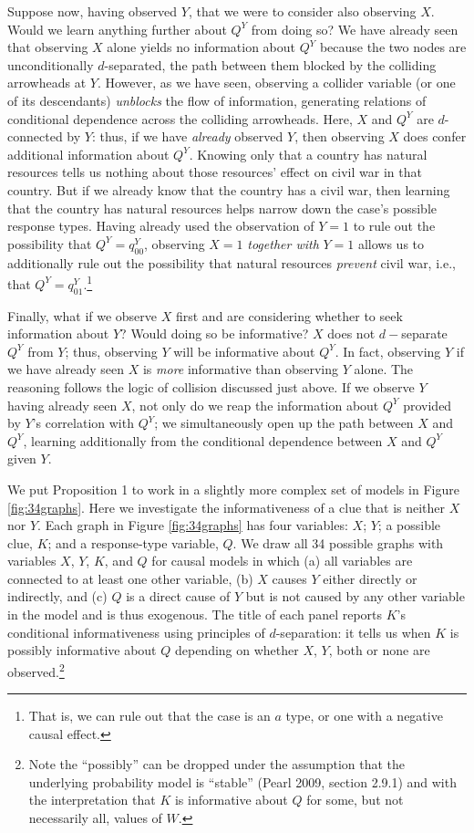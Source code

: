 \documentclass[
  12pt,
]{book}
\begin{document}
Suppose now, having observed \(Y\), that we were to consider also observing \(X\). Would we learn anything further about \(Q^Y\) from doing so? We have already seen that observing \(X\) alone yields no information about \(Q^Y\) because the two nodes are unconditionally \(d\)-separated, the path between them blocked by the colliding arrowheads at \(Y\). However, as we have seen, observing a collider variable (or one of its descendants) \emph{unblocks} the flow of information, generating relations of conditional dependence across the colliding arrowheads. Here, \(X\) and \(Q^Y\) are \(d\)-connected by \(Y\): thus, if we have \emph{already} observed \(Y\), then observing \(X\) does confer additional information about \(Q^Y\). Knowing only that a country has natural resources tells us nothing about those resources' effect on civil war in that country. But if we already know that the country has a civil war, then learning that the country has natural resources helps narrow down the case's possible response types. Having already used the observation of \(Y=1\) to rule out the possibility that \(Q^Y=q^Y_{00}\), observing \(X=1\) \emph{together with} \(Y=1\) allows us to additionally rule out the possibility that natural resources \emph{prevent} civil war, i.e., that \(Q^Y=q^Y_{01}\).\footnote{That is, we can rule out that the case is an \(a\) type, or one with a negative causal effect.}

Finally, what if we observe \(X\) first and are considering whether to seek information about \(Y\)? Would doing so be informative? \(X\) does not \(d-\)separate \(Q^Y\) from \(Y\); thus, observing \(Y\) will be informative about \(Q^Y\). In fact, observing \(Y\) if we have already seen \(X\) is \emph{more} informative than observing \(Y\) alone. The reasoning follows the logic of collision discussed just above. If we observe \(Y\) having already seen \(X\), not only do we reap the information about \(Q^Y\) provided by \(Y\)'s correlation with \(Q^Y\); we simultaneously open up the path between \(X\) and \(Q^Y\), learning additionally from the conditional dependence between \(X\) and \(Q^Y\) given \(Y\).

We put Proposition 1 to work in a slightly more complex set of models in Figure \ref{fig:34graphs}. Here we investigate the informativeness of a clue that is neither \(X\) nor \(Y\). Each graph in Figure \ref{fig:34graphs} has four variables: \(X\); \(Y\); a possible clue, \(K\); and a response-type variable, \(Q\). We draw all 34 possible graphs with variables \(X\), \(Y\), \(K\), and \(Q\) for causal models in which (a) all variables are connected to at least one other variable, (b) \(X\) causes \(Y\) either directly or indirectly, and (c) \(Q\) is a direct cause of \(Y\) but is not caused by any other variable in the model and is thus exogenous. The title of each panel reports \(K\)'s conditional informativeness using principles of \(d\)-separation: it tells us when \(K\) is possibly informative about \(Q\) depending on whether \(X\), \(Y\), both or none are observed.\footnote{Note the ``possibly'' can be dropped under the assumption that the underlying probability model is ``stable'' (Pearl 2009, section 2.9.1) and with the interpretation that \(K\) is informative about \(Q\) for some, but not necessarily all, values of \(W\).}
\end{document}
